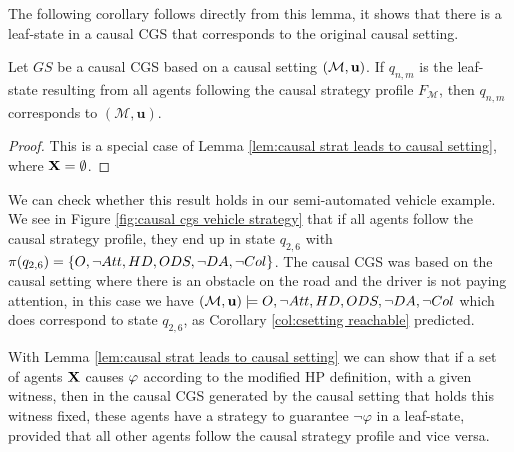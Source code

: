 The following corollary follows directly from this lemma, it shows that there is a leaf-state in a causal CGS that corresponds to the original causal setting.

\begin{corollary}\label{col:csetting reachable}
    Let $GS$ be a causal CGS based on a causal setting $(\mathcal{M},\mathbf{u})$. If $q_{n,m}$ is the leaf-state resulting from all agents following the causal strategy profile $F_{\mathcal{M}}$, then $q_{n,m}$ corresponds to $(\mathcal{M},\mathbf{u})$.
\end{corollary}
\begin{proof}
    This is a special case of Lemma \ref{lem:causal strat leads to causal setting}, where $\mathbf{X} = \emptyset$.
\end{proof}

We can check whether this result holds in our semi-automated vehicle example.
We see in Figure \ref{fig:causal cgs vehicle strategy} that if all agents follow the causal strategy profile, they end up in state $q_{2,6}$ with $\pi(q_{2,6}) = \{ {O, \neg Att, HD, ODS, \neg DA, \neg Col} \}$.
The causal CGS was based on the causal setting where there is an obstacle on the road and the driver is not paying attention, in this case we have $(\mathcal{M},\mathbf{u}) \models O, \neg Att, HD, ODS, \neg DA, \neg Col$ which does correspond to state $q_{2,6}$, as Corollary \ref{col:csetting reachable} predicted.

With Lemma \ref{lem:causal strat leads to causal setting} we can show that if a set of agents $\mathbf{X}$ causes $\varphi$ according to the modified HP definition, with a given witness, then in the causal CGS generated by the causal setting that holds this witness fixed, these agents have a strategy to guarantee $\neg \varphi$ in a leaf-state, provided that all other agents follow the causal strategy profile and vice versa.

